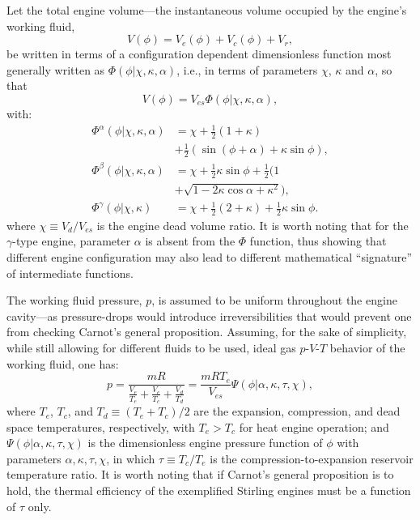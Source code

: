     Let the total engine volume---the instantaneous volume  occupied  by  the  engine's  working
    fluid,
    \begin{equation}
        V(\phi) = V_e(\phi) + V_c(\phi) + V_r,
    \end{equation}
    \noindent be written in terms of  a  configuration  dependent  dimensionless  function  most
    generally written as $\Phi(\phi | \chi, \kappa,  \alpha)$,  i.e.,  in  terms  of  parameters
    $\chi$, $\kappa$ and $\alpha$, so that
    \begin{equation}
        V(\phi) = V_{es}\Phi(\phi | \chi, \kappa, \alpha),
    \end{equation}
    \noindent with:
    \begin{align}
        \label{eq:Phia}
        \Phi^{\alpha}(\phi | \chi, \kappa, \alpha) &= \chi + \frac{1}{2}(1 + \kappa) \nonumber\\
            &+ \frac{1}{2}(\sin(\phi + \alpha) + \kappa\sin\phi),\\
        \label{eq:Phib}
        \Phi^{\beta}(\phi | \chi, \kappa, \alpha) &= \chi + \frac{1}{2}\kappa\sin\phi +
            \frac{1}{2}(1 \nonumber\\
            &+ \sqrt{1 - 2\kappa\cos\alpha + \kappa^2}),\\
        \label{eq:Phig}
        \Phi^{\gamma}(\phi | \chi, \kappa) &= \chi + \frac{1}{2}(2 + \kappa)
            + \frac{1}{2}\kappa\sin\phi.
    \end{align}
    \noindent where $\chi \equiv V_{d}/V_{es}$ is the engine dead  volume  ratio.  It  is  worth
    noting that for the $\gamma$-type engine, parameter  $\alpha$  is  absent  from  the  $\Phi$
    function, thus showing that different  engine  configuration  may  also  lead  to  different
    mathematical ``signature'' of intermediate functions.

    The working fluid pressure, $p$, is assumed to be uniform throughout the engine  cavity---as
    pressure-drops would introduce  irreversibilities  that  would  prevent  one  from  checking
    Carnot's general proposition. Assuming, for the sake of simplicity, while still allowing for
    different fluids to be used, ideal gas $p$-$V$-$T$ behavior of the working fluid, one has:
    \begin{equation}
        \label{eq:P}
        p = \frac{mR}{\frac{V_e}{T_e} + \frac{V_c}{T_c} + \frac{V_d}{T_d}}
          = \frac{mRT_e}{V_{es}}\Psi(\phi | \alpha, \kappa, \tau, \chi),
    \end{equation}
    \noindent where $T_e$, $T_c$, and $T_d \equiv (T_e + T_c)/2$ are the expansion, compression,
    and dead space temperatures, respectively, with $T_e > T_c$ for heat engine  operation;  and
    $\Psi(\phi | \alpha, \kappa, \tau, \chi)$ is the dimensionless engine pressure  function  of
    $\phi$ with parameters $\alpha, \kappa, \tau, \chi$, in which $\tau \equiv T_c / T_e$ is the
    compression-to-expansion reservoir temperature ratio. It is worth noting  that  if  Carnot's
    general proposition is to hold, the thermal efficiency of the exemplified  Stirling  engines
    must be a function of $\tau$ only.

